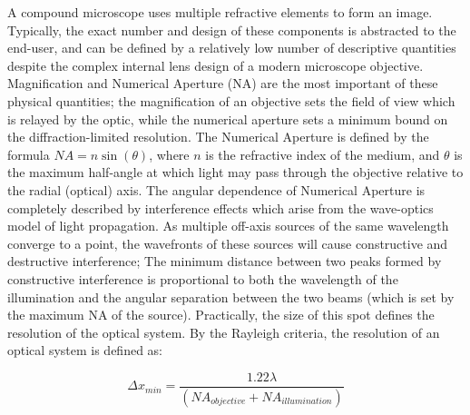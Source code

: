 A compound microscope uses multiple refractive elements to form an image. Typically, the exact number and design of these components is abstracted to the end-user, and can be defined by a relatively low number of descriptive quantities despite the complex internal lens design of a modern microscope objective. Magnification and Numerical Aperture (NA) are the most important of these physical quantities; the magnification of an objective sets the field of view which is relayed by the optic, while the numerical aperture sets a minimum bound on the diffraction-limited resolution. The Numerical Aperture is defined by the formula $NA=n\sin (\theta)$, where $n$ is the refractive index of the medium, and $\theta$ is the maximum half-angle at which light may pass through the objective relative to the radial (optical) axis. The angular dependence of Numerical Aperture is completely described by interference effects which arise from the wave-optics model of light propagation. As multiple off-axis sources of the same wavelength converge to a point, the wavefronts of these sources will cause constructive and destructive interference; The minimum distance between two peaks formed by constructive interference is proportional to both the wavelength of the illumination and the angular separation between the two beams (which is set by the maximum NA of the source). Practically, the size of this spot defines the resolution of the optical system. By the Rayleigh criteria, the resolution of an optical system is defined as:

\begin{equation}\label{eq:intro:rayleigh}
\Delta x_{min}  = \frac{1.22 \lambda}{(NA_{objective} + NA_{illumination})}
\end{equation}

